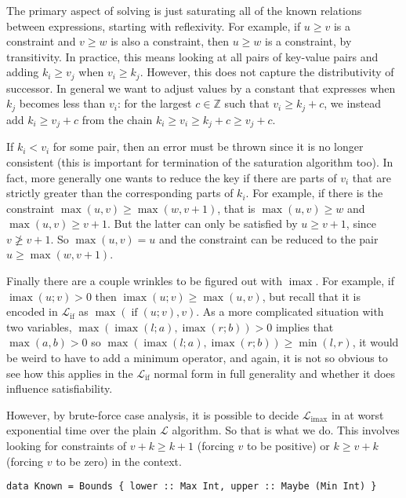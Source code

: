 \documentclass[11pt, twoside, reqno]{book}
\DeclareMathOperator{\imax}{imax}
\DeclareMathOperator{\ifop}{if}
\begin{document}
The primary aspect of solving is just saturating all of the known relations between expressions, starting with reflexivity.
For example, if \(u \ge v\) is a constraint and \(v \ge w\) is also a constraint, then \(u \ge w\) is a constraint, by transitivity.
In practice, this means looking at all pairs of key-value pairs and adding \(k_i \ge v_j\) when \(v_i \ge k_j\).
However, this does not capture the distributivity of successor.
In general we want to adjust values by a constant that expresses when \(k_j\) becomes less than \(v_i\): for the largest \(c \in \mathbb{Z}\) such that \(v_i \ge k_j + c\), we instead add \(k_i \ge v_j + c\) from the chain \(k_i \ge v_i \ge k_j + c \ge v_j + c\).

If \(k_i < v_i\) for some pair, then an error must be thrown since it is no longer consistent (this is important for termination of the saturation algorithm too).
In fact, more generally one wants to reduce the key if there are parts of \(v_i\) that are strictly greater than the corresponding parts of \(k_i\).
For example, if there is the constraint \(\max(u, v) \ge \max(w, v+1)\), that is \(\max(u, v) \ge w\) and \(\max(u, v) \ge v+1\).
But the latter can only be satisfied by \(u \ge v+1\), since \(v \ngeq v+1\).
So \(\max(u, v) = u\) and the constraint can be reduced to the pair \(u \ge \max(w, v+1)\).

Finally there are a couple wrinkles to be figured out with \(\imax\).
For example, if \(\imax(u; v) > 0\) then \(\imax(u; v) \ge \max(u, v)\), but recall that it is encoded in \(\mathcal{L}_{\ifop}\) as \(\max(\ifop(u; v), v)\).
As a more complicated situation with two variables, \(\max(\imax(l; a), \imax(r; b)) > 0\) implies that \(\max(a, b) > 0\) so \(\max(\imax(l; a), \imax(r; b)) \ge \min(l, r)\), it would be weird to have to add a minimum operator, and again, it is not so obvious to see how this applies in the \(\mathcal{L}_{\ifop}\) normal form in full generality and whether it does influence satisfiability.

However, by brute-force case analysis, it is possible to decide \(\mathcal{L}_{\imax}\) in at worst exponential time over the plain \(\mathcal{L}\) algorithm.
So that is what we do.
This involves looking for constraints of \(v+k \ge k+1\) (forcing \(v\) to be positive) or \(k \ge v+k\) (forcing \(v\) to be zero) in the context.

\begin{verbatim}
data Known = Bounds { lower :: Max Int, upper :: Maybe (Min Int) }
\end{verbatim}
\end{document}
